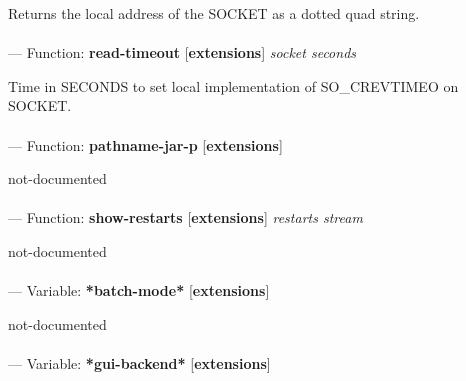 \begin{adjustwidth}{5em}{5em}
Returns the local address of the SOCKET as a dotted quad string.
\end{adjustwidth}

\paragraph{}
\label{EXTENSIONS:READ-TIMEOUT}
--- Function: \textbf{read-timeout} [\textbf{extensions}] \textit{socket seconds}

\begin{adjustwidth}{5em}{5em}
Time in SECONDS to set local implementation of SO\_CREVTIMEO on SOCKET.
\end{adjustwidth}

\paragraph{}
\label{EXTENSIONS:PATHNAME-JAR-P}
--- Function: \textbf{pathname-jar-p} [\textbf{extensions}] \textit{}

\begin{adjustwidth}{5em}{5em}
not-documented
\end{adjustwidth}

\paragraph{}
\label{EXTENSIONS:SHOW-RESTARTS}
--- Function: \textbf{show-restarts} [\textbf{extensions}] \textit{restarts stream}

\begin{adjustwidth}{5em}{5em}
not-documented
\end{adjustwidth}

\paragraph{}
\label{EXTENSIONS:*BATCH-MODE*}
--- Variable: \textbf{*batch-mode*} [\textbf{extensions}] \textit{}

\begin{adjustwidth}{5em}{5em}
not-documented
\end{adjustwidth}

\paragraph{}
\label{EXTENSIONS:*GUI-BACKEND*}
--- Variable: \textbf{*gui-backend*} [\textbf{extensions}] \textit{}

